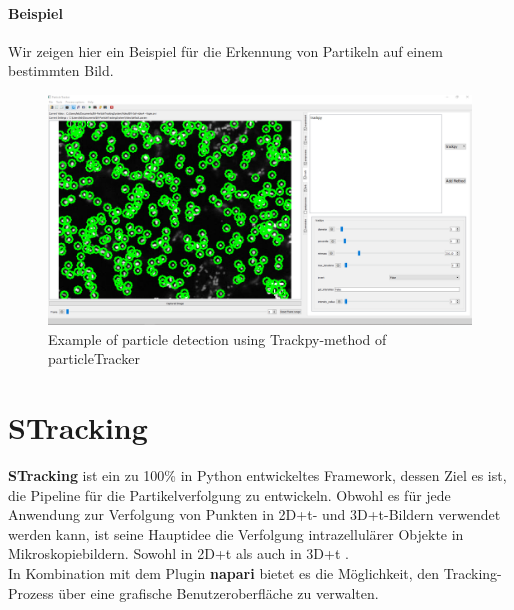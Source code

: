 	\paragraph{Beispiel}
	Wir zeigen hier ein Beispiel für die Erkennung von Partikeln auf einem bestimmten Bild.
	 
	\begin{figure}[H]
    \centering
    \includegraphics[scale=0.3]{Grafiken/particletracker/Using trackpy.png}
    \caption{Example of particle detection using Trackpy-method of particleTracker}
    \label{fig:bild_label}
\end{figure}

\newpage
	
\section{STracking}
\textbf{STracking} ist ein zu 100\% in Python entwickeltes Framework, dessen Ziel es ist, die Pipeline für die Partikelverfolgung zu entwickeln.
Obwohl es für jede Anwendung zur Verfolgung von Punkten in 2D+t- und 3D+t-Bildern verwendet werden kann, ist seine Hauptidee die Verfolgung intrazellulärer Objekte in Mikroskopiebildern. Sowohl in 2D+t als auch in 3D+t \cite{prigent_2020}.\\
In Kombination mit dem Plugin \textbf{napari}\cite{prigent_2021_napari} bietet es die Möglichkeit, den Tracking-Prozess über eine grafische Benutzeroberfläche zu verwalten.

